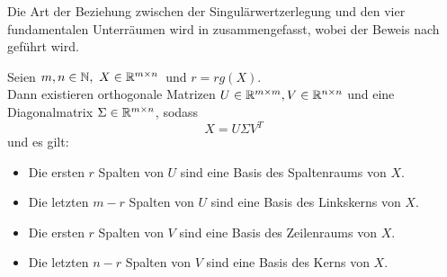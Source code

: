 Die Art der Beziehung zwischen der Singulärwertzerlegung und den vier fundamentalen Unterräumen wird in  zusammengefasst, wobei
der Beweis nach~\cite[S. 214~f.]{johnstonAdvancedLinearMatrix2021} geführt wird.
\begin{corollary}\label{cor:svd}
    Seien \(m,n\in\mathbb{N},\ X \in \mathbb{R}^{m \times n}\)\ und \(r = \textit{rg}(X)\).  \\
    Dann existieren orthogonale Matrizen \(U \in \mathbb{R}^{m \times m}, V \in \mathbb{R}^{n \times n}\) und eine Diagonalmatrix \(\Sigma \in \mathbb{R}^{m \times n}\), sodass
    \begin{equation*}
        X = U \Sigma V^{T}
    \end{equation*}   
    und es gilt:
    \begin{itemize}
        \item Die ersten \(r\) Spalten von \(U\) sind eine Basis des Spaltenraums von \(X\).
        \item Die letzten \(m-r\) Spalten von \(U\) sind eine Basis des Linkskerns von \(X\).
        \item Die ersten \(r\) Spalten von \(V\) sind eine Basis des Zeilenraums von \(X\).
        \item Die letzten \(n - r\) Spalten von \(V\) sind eine Basis des Kerns von \(X\).          
    \end{itemize}
\end{corollary}
